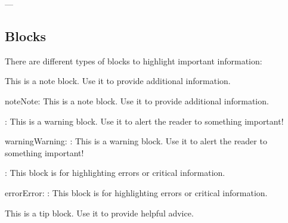 \documentclass[a4paper,10pt,english]{sphinxmanual}
\begin{document}
\sphinxAtStartPar
—


\subsection{Blocks}
\label{\detokenize{page_two:blocks}}
\sphinxAtStartPar
There are different types of blocks to highlight important information:

\begin{sphinxVerbatim}[commandchars=\\\{\}]
 
    This is a note block. Use it to provide additional information.
\end{sphinxVerbatim}

\begin{sphinxadmonition}{note}{Note:}
\sphinxAtStartPar
This is a note block. Use it to provide additional information.
\end{sphinxadmonition}

\begin{sphinxVerbatim}[commandchars=\\\{\}]
 
    : This is a warning block. Use it to alert the reader to something important!
\end{sphinxVerbatim}

\begin{sphinxadmonition}{warning}{Warning:}
\sphinxAtStartPar
{}: This is a warning block. Use it to alert the reader to something important!
\end{sphinxadmonition}

\begin{sphinxVerbatim}[commandchars=\\\{\}]
 
    : This block is for highlighting errors or critical information.
\end{sphinxVerbatim}

\begin{sphinxadmonition}{error}{Error:}
\sphinxAtStartPar
{}: This block is for highlighting errors or critical information.
\end{sphinxadmonition}

\begin{sphinxVerbatim}[commandchars=\\\{\}]
 
    This is a tip block. Use it to provide helpful advice.
\end{sphinxVerbatim}
\end{document}
